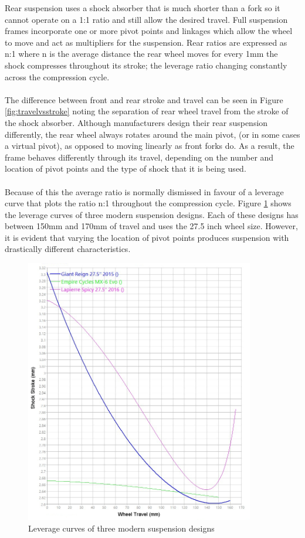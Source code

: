 		Rear suspension uses a shock absorber that is much shorter than a fork so  it cannot operate on a 1:1 ratio and still allow the desired travel. Full suspension frames incorporate one or more pivot points and linkages which allow the wheel to move and act as multipliers for the suspension. Rear ratios are expressed as n:1 where n is the average distance the rear wheel moves for every 1mm the shock compresses throughout its stroke; the leverage ratio changing constantly across the compression cycle.
		\\\\
		The difference between front and rear stroke and travel can be seen in Figure \ref{fig:travelvsstroke} noting the separation of rear wheel travel from the stroke of the shock absorber. Although manufacturers design their rear suspension differently, the rear wheel always  rotates around the main pivot, (or in some cases a virtual pivot), as opposed to moving linearly as front forks do. As a result, the frame  behaves differently through its travel, depending on the number and location of pivot points and the type of shock that it is being used. 
		\\\\
		Because of this the average ratio is normally dismissed in favour of a leverage curve that plots the ratio n:1 throughout the compression cycle. Figure \ref{fig:3_bike_lev_ratio} shows the leverage curves of three modern suspension designs. Each of these designs has between 150mm and 170mm of travel and uses the 27.5 inch wheel size. However, it is evident that varying the location of pivot points produces suspension with  drastically different characteristics.
		\begin{figure}[h!]
			\centering
			\includegraphics[width=10cm]{../images/3_bike_lev_ratio.jpg}
			\caption{Leverage curves of three modern suspension designs}
			\label{fig:3_bike_lev_ratio}
		\end{figure}
